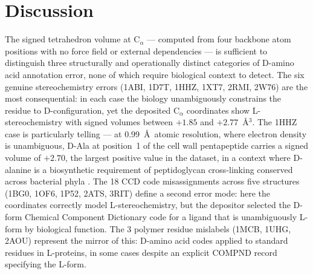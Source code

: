 \documentclass[11pt]{article}
\begin{document}
\section{Discussion}

The signed tetrahedron volume at C$_\alpha$ --- computed from four backbone atom positions with no force field or external dependencies --- is sufficient to distinguish three structurally and operationally distinct categories of D-amino acid annotation error, none of which require biological context to detect. The six genuine stereochemistry errors (1ABI, 1D7T, 1HHZ, 1XT7, 2RMI, 2W76) are the most consequential: in each case the biology unambiguously constrains the residue to D-configuration, yet the deposited C$_\alpha$ coordinates show L-stereochemistry with signed volumes between $+1.85$ and $+2.77$~\AA$^3$. The 1HHZ case is particularly telling --- at 0.99~\AA\ atomic resolution, where electron density is unambiguous, D-Ala at position~1 of the cell wall pentapeptide carries a signed volume of $+2.70$, the largest positive value in the dataset, in a context where D-alanine is a biosynthetic requirement of peptidoglycan cross-linking conserved across bacterial phyla \citep{miyamoto2021,cava2011}. The 18 CCD code misassignments across five structures (1BG0, 1OF6, 1P52, 2ATS, 3RIT) define a second error mode: here the coordinates correctly model L-stereochemistry, but the depositor selected the D-form Chemical Component Dictionary code for a ligand that is unambiguously L-form by biological function. The 3 polymer residue mislabels (1MCB, 1UHG, 2AOU) represent the mirror of this: D-amino acid codes applied to standard residues in L-proteins, in some cases despite an explicit COMPND record specifying the L-form.
\end{document}
